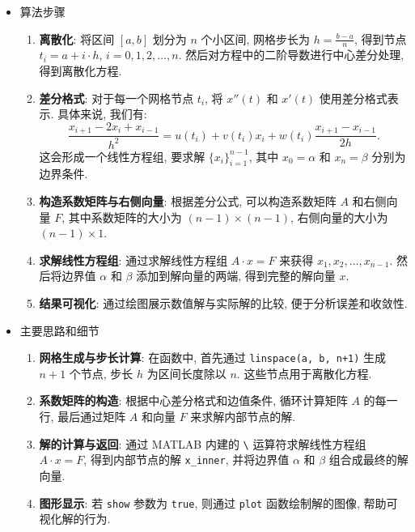\documentclass[11pt]{article}
\begin{document}
\begin{itemize}
	\item 算法步骤
	
	\begin{enumerate}
		\item \textbf{离散化}: 将区间 $[a, b]$ 划分为 $n$ 个小区间, 网格步长为 $h = \frac{b - a}{n}$, 得到节点 $t_i = a + i \cdot h$, $i=0, 1, 2, \dots, n$. 然后对方程中的二阶导数进行中心差分处理, 得到离散化方程. 
		
		\item \textbf{差分格式}: 对于每一个网格节点 $t_i$, 将 $x''(t)$ 和 $x'(t)$ 使用差分格式表示. 具体来说, 我们有:
		\begin{equation*}
			\frac{x_{i+1} - 2x_i + x_{i-1}}{h^2} = u(t_i) + v(t_i) x_i + w(t_i) \frac{x_{i+1} - x_{i-1}}{2h}.
		\end{equation*}
		这会形成一个线性方程组, 要求解 $\{x_i\}_{i=1}^{n-1}$, 其中 $x_0 = \alpha$ 和 $x_n = \beta$ 分别为边界条件.
		
		\item \textbf{构造系数矩阵与右侧向量}: 根据差分公式, 可以构造系数矩阵 $A$ 和右侧向量 $F$, 其中系数矩阵的大小为 $(n-1) \times (n-1)$, 右侧向量的大小为 $(n-1) \times 1$.
		
		\item \textbf{求解线性方程组}: 通过求解线性方程组 $A \cdot x = F$ 来获得 $x_1, x_2, \dots, x_{n-1}$. 然后将边界值 $\alpha$ 和 $\beta$ 添加到解向量的两端, 得到完整的解向量 $x$.
		
		\item \textbf{结果可视化}: 通过绘图展示数值解与实际解的比较, 便于分析误差和收敛性.
	\end{enumerate}
	
	\item 主要思路和细节
	
	\begin{enumerate}
		\item \textbf{网格生成与步长计算}: 在函数中, 首先通过 \texttt{linspace(a, b, n+1)} 生成 $n+1$ 个节点, 步长 $h$ 为区间长度除以 $n$. 这些节点用于离散化方程. 
		
		\item \textbf{系数矩阵的构造}: 根据中心差分格式和边值条件, 循环计算矩阵 $A$ 的每一行, 最后通过矩阵 $A$ 和向量 $F$ 来求解内部节点的解. 
		
		\item \textbf{解的计算与返回}: 通过 MATLAB 内建的 \texttt{\textbackslash} 运算符求解线性方程组 $A \cdot x = F$, 得到内部节点的解 \texttt{x\_inner}, 并将边界值 $\alpha$ 和 $\beta$ 组合成最终的解向量. 
		
		\item \textbf{图形显示}: 若 \texttt{show} 参数为 \texttt{true}, 则通过 \texttt{plot} 函数绘制解的图像, 帮助可视化解的行为. 
	\end{enumerate}
\end{itemize}
\end{document}
